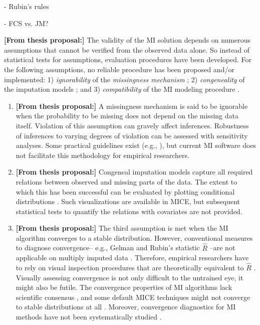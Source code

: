 \documentclass[article]{jss}
\begin{document}
- Rubin's rules

- FCS vs. JM?

\textbf{[From thesis proposal:]} The validity of the MI solution depends on numerous assumptions that cannot be verified from the observed data alone. So instead of statistical tests for assumptions, evaluation procedures have been developed. For the following assumptions, no reliable procedure has been proposed and/or implemented: 1) \emph{ignorability} of the \emph{missingness mechanism} \citep{rubin87}; 2) \emph{congeneality} of the imputation models \citep{meng94}; and 3) \emph{compatibility} of the MI modeling procedure \citep{rubin96}. 

\begin{enumerate}
\item \textbf{[From thesis proposal:]} A missingness mechanism is said to be ignorable when the probability to be missing does not depend on the missing data itself. Violation of this assumption can gravely affect inferences. Robustness of inferences to varying degrees of violation can be assessed with sensitivity analyses. Some practical guidelines exist (e.g., \citep{nguy17}), but current MI software does not facilitate this methodology for empirical researchers.  %
%
\item \textbf{[From thesis proposal:]} Congeneal imputation models capture all required relations between observed and missing parts of the data. The extent to which this has been successful can be evaluated by plotting conditional distributions \citep{abay08}. Such visualizations are available in MICE, but subsequent statistical tests to quantify the relations with covariates are not provided. 
%
\item \textbf{[From thesis proposal:]} The third assumption is met when the MI algorithm converges to a stable distribution. However, conventional measures to diagnose convergence-- e.g., Gelman and Rubin's \citeyear{gelm92} statistic $\widehat{R}$ --are not applicable on multiply imputed data \citep{lace07}. Therefore, empirical researchers have to rely on visual inspection procedures that are theoretically equivalent to $\widehat{R}$ \citep{whit11}. Visually assessing convergence is not only difficult to the untrained eye, it might also be futile. The convergence properties of MI algorithms lack scientific consensus \citep{taka17}, and some default MICE techniques might not converge to stable distributions at all \citep{murr18}. Moreover, convergence diagnostics for MI methods have not been systematically studied \citep{buur18}.
\end{enumerate}
\end{document}
